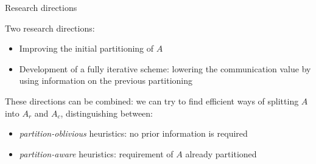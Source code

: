 \begin{frame}{Research directions}


	Two research directions:

\begin{itemize}
	\item Improving the initial partitioning of $A$
	\item Development of a fully iterative scheme: lowering the communication value by using information on the previous partitioning 
\end{itemize}

These directions can be combined: we can try to find efficient ways of splitting $A$ into $A_r$ and $A_c$, distinguishing between:

\begin{itemize}
	\item \emph{partition-oblivious} heuristics: no prior information is required
	\item \emph{partition-aware} heuristics: requirement of $A$ already partitioned
\end{itemize}
\end{frame}
